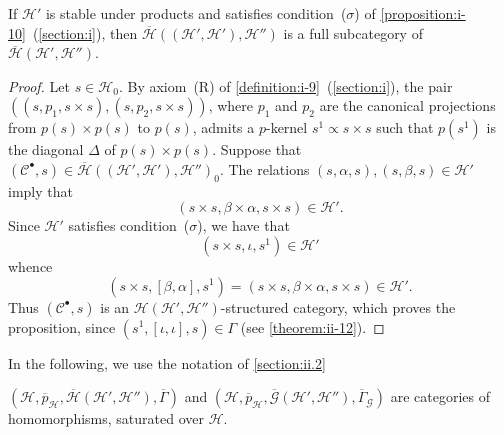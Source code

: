 \documentclass[a4paper,fleqn]{article}
\theoremstyle{plain}
\newenvironment{theorem}[1]
  {\renewcommand\theinnertheorem{#1}\innertheorem}
  {\endinnertheorem}
\newenvironment{proposition}[1]
  {\renewcommand\theinnerproposition{#1}\innerproposition}
  {\endinnerproposition}
\theoremstyle{definition}
\newcommand{\CC}{\mathcal{C}}
\newcommand{\HH}{\mathcal{H}}
\newcommand{\subs}{\mathrel{\propto}}
\newcommand{\GG}{\mathcal{G}}
\newcommand{\smallbullet}{\bullet}
\begin{document}
\begin{proposition}{29}
\label{proposition:ii-29}
  If $\HH'$ is stable under products and satisfies condition~($\sigma$) of \cref{proposition:i-10}~(\cref{section:i}), then $\overline{\HH}((\HH',\HH'),\HH'')$ is a full subcategory of $\overline{\HH}(\HH',\HH'')$.
\end{proposition}

\begin{proof}
  Let $s\in\HH_0$.
  By axiom~(R) of \cref{definition:i-9}~(\cref{section:i}), the pair $((s,p_1,s\times s),(s,p_2,s\times s))$, where $p_1$ and $p_2$ are the canonical projections from $p(s)\times p(s)$ to $p(s)$, admits a $p$-kernel $s^1\subs s\times s$ such that $p(s^1)$ is the diagonal $\Delta$ of $p(s)\times p(s)$.
  Suppose that $(\CC^\smallbullet,s)\in\overline{\HH}((\HH',\HH'),\HH'')_0$.
  The relations $(s,\alpha,s),(s,\beta,s)\in\HH'$ imply that
  \[
    (s\times s, \beta\times\alpha, s\times s)
    \in\HH'.
  \]
  Since $\HH'$ satisfies condition~($\sigma$), we have that
  \[
    (s\times s,\iota,s^1)\in\HH'
  \]
  whence
  \[
    (s\times s,[\beta,\alpha],s^1)
    = (s\times s,\beta\times\alpha,s\times s)
    \in\HH'.
  \]
  Thus $(\CC^\smallbullet,s)$ is an $\HH(\HH',\HH'')$-structured category, which proves the proposition, since $(s^1,[\iota,\iota],s)\in\Gamma$ (see \cref{theorem:ii-12}).
\end{proof}

In the following, we use the notation of \cref{section:ii.2}

\begin{theorem}{11}
\label{theorem:ii-11}
  $(\HH,\overline{p}_\HH,\overline{\HH}(\HH',\HH''),\overline{\Gamma})$ and $(\HH,\overline{p}_\HH,\overline{\GG}(\HH',\HH''),\overline{\Gamma}_\GG)$ are categories of homomorphisms, saturated over $\HH$.
\end{theorem}
\end{document}
